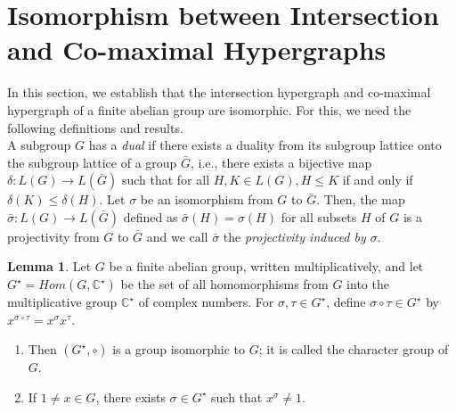 \documentclass[11pt,a4paper]{article}
\theoremstyle{definition}
\newtheorem{lemma}[theorem]{Lemma}
\theoremstyle{remark}
\begin{document}
	\section{Isomorphism between Intersection and Co-maximal Hypergraphs}
	In this section, we establish that the intersection hypergraph and co-maximal hypergraph of a finite abelian group are isomorphic. For this, we need the following definitions and results.\\
		A subgroup $G$ has a \textit{dual} if there exists a duality from its subgroup lattice onto the subgroup lattice of a group $\bar{G}$, i.e., there exists a bijective map $\delta: L(G) \rightarrow L(\bar{G})$ such that for all $H,K \in L(G), H \leq K$ if and only if $\delta(K) \leq \delta(H)$. Let $\sigma$ be an isomorphism from $G$ to $\bar{G}$. Then, the map $\bar{\sigma}:L(G) \rightarrow L(\bar{G})$ defined as $\bar{\sigma}(H)=\sigma(H)$ for all subsets $H$ of $G$ is a projectivity from $G$ to $\bar{G}$ and we call $\bar{\sigma}$ the \textit{projectivity induced by $\sigma$}.
	\begin{lemma}\cite{schmidt}
		Let $G$ be a finite abelian group, written multiplicatively, and let $G^{\star}=Hom(G, \mathbb{C}^\star)$ be the set of all homomorphisms from $G$ into the multiplicative group $\mathbb{C}^{\star}$ 
		of complex numbers. For $\sigma, \tau \in G^\star$, define $\sigma \circ\tau \in G^\star$ by $x^{\sigma \circ\tau} = x^{\sigma}  x^{\tau}$.
		\begin{enumerate}
			\item Then $(G^\star, \circ)$ is a group isomorphic to $G$; it is called the character group of $G$.
			\item  If $1 \neq x \in G$, there exists $\sigma \in G^\star$ such that $x^{\sigma} \neq 1$.
		\end{enumerate}  
	\end{lemma}
 
\end{document}
